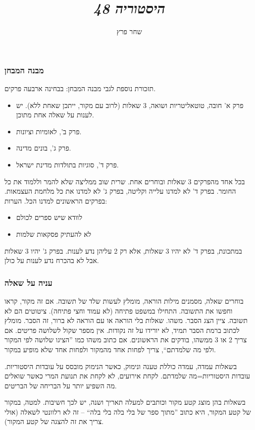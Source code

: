 \documentclass[]{../../../../tex/classes/styledArticle}
\author{שחר פרץ}
\title{\textit{היסטוריה 48}}
\begin{document}
	\maketitle
	\subsubsection*{מבנה המבחן}
	תזכורת נוספת לגבי מבנה המבחן: בבחינה ארבעה פרקים.
	\begin{itemize}
		\item פרק א' חובה, טוטאליטריות ושואה, 3 שאלות (לרוב עם מקור, ייתכן שאחת ללא). יש לענות על שאלה אחת מתוכן. 
		\item פרק ב', לאומיות וציונות. 
		\item פרק ג', בונים מדינה. 
		\item פרק ד', סוגיות בתולדות מדינת ישראל. 
	\end{itemize}
	בכל אחד מהפרקים 3 שאלות ובוחרים אחת. שרית שוב ממליצה שלא להמר וללמוד את כל החומר. בפרק ד' לא למדנו עלייה וקליטה, בפרק ג' לא למדנו את כל מלחמת העצמאות. בפרקים הראשונים למדנו הכל. הערות: 
	\begin{itemize}
		\item לוודא שיש ספרים לכולם
		\item לא להעתיק פסקאות שלמות
	\end{itemize}
	
	במתכונת, בפרק ד' לא יהיו 3 שאלות, אלא רק 2 עליהן נדע לענות. בפרק ג' יהיו 3 שאלות אבל לא בהכרח נדע לענות על כולן. 
	
	\subsubsection*{עניה על שאלה}
	בוחרים שאלה, מסמנים מילות הוראה, מומלץ לעשות שלד של תשובה. אם זה מקור, קראו וחפשו את התשובה. התחילו במשפט פתיחה (לא עמוד וחצי פתיחה). ציטוטים הם לא תשובה. ציין הצג הסבר. משהו. שאלות בלי הוראה או עם הוראה לא ברור, זה הסבר. מומלץ לכתוב ברמת הסבר תמיד, לא יורידו על זה נקודות. אין מספר שקול לשלושה פריטים. אם צריך 2 או 3 ממשהו, בודקים את הראשונים. אם כתוב משהו כמו ''הציגו שלושה לפי המקור ולפי מה שלמדתם``, צריך לפחות אחד מהמקור ולפחות אחד שלא מופיע במקור. 
	
	בשאלות עמדה, עמדה כוללת טענה ונימוק, כאשר הנימוק מובסס על עובדות היסטוריות. עובדות היסטוריות=מה שלמדתם. לקחת אירועים, לא לקחת את תנועת המרי כאשר שואלים מה השפיע יותר על הבריחה של הבריטים. 
	
	בשאלות בהן מוצג קטע מקור וכותבים למעלה תאריך ושנה, יש לכך חשיבות. למטה, במקור של קטע המקור, היא כתוב ''מתוך ספר של בלי בלה בלי בלה`` – זה לא רלוונטי לשאלה (אולי צריך את זה להצגה של קטע המקור). 
	
\end{document}

